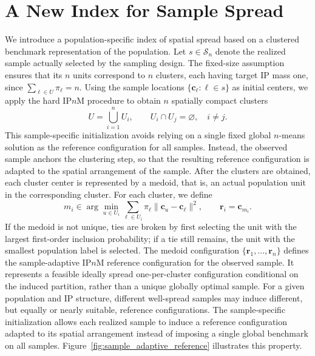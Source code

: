 \documentclass[12pt]{imsart}
\theoremstyle{plain}
\theoremstyle{remark}
\begin{document}
\section{A New Index for Sample Spread}
\label{Sec:Measure}
We introduce a population-specific index of spatial spread based on a clustered
benchmark representation of the population. Let \(s\in\mathcal S_n\) denote the realized sample actually selected by the
sampling design. The fixed-size assumption ensures that its \(n\) units
correspond to \(n\) clusters, each having target IP mass one, since
\(\sum_{\ell\in U}\pi_\ell=n\).  Using the sample locations
\(\{\bm c_\ell:\ell\in s\}\) as initial centers, we apply the hard IP\(n\)M
procedure to obtain \(n\) spatially compact clusters
\[
U=\bigcup_{i=1}^n U_i,
\qquad
U_i\cap U_j=\varnothing,\quad i\neq j .
\]
This sample-specific initialization avoids relying on a single fixed global
\(n\)-means solution as the reference configuration for all samples. Instead,
the observed sample anchors the clustering step, so that the resulting
reference configuration is adapted to the spatial arrangement of the sample. After the clusters are
obtained, each cluster center is represented by a medoid, that is, an actual
population unit in the corresponding cluster. For each cluster, we define
\[
m_i
\in
\arg\min_{u\in U_i}
\sum_{\ell\in U_i}\pi_\ell
\|\bm c_u-\bm c_\ell\|^2,
\qquad
\bm r_i=\bm c_{m_i}.
\]
If the medoid is not unique, ties are broken by first selecting the unit with
the largest first-order inclusion probability; if a tie still remains, the unit
with the smallest population label is selected. 
The medoid configuration
\(\{\bm r_1,\ldots,\bm r_n\}\) defines the sample-adaptive IP\(n\)M
reference configuration for the observed sample. It represents a feasible
ideally spread one-per-cluster configuration conditional on the induced
partition, rather than a unique globally optimal sample. For a given
population and IP structure, different well-spread samples may induce
different, but equally or nearly suitable, reference configurations. The
sample-specific initialization allows each realized sample to induce a
reference configuration adapted to its spatial arrangement instead of
imposing a single global benchmark on all samples.
Figure~\ref{fig:sample_adaptive_reference} illustrates this property.
\end{document}
